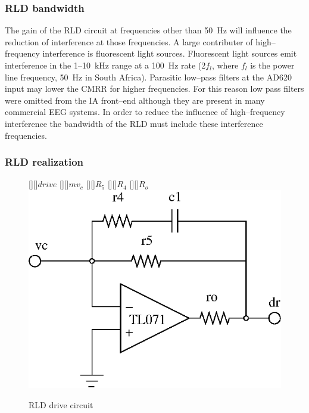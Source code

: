 \subsubsection{RLD bandwidth}
The gain of the RLD circuit at frequencies other than 50~Hz will
influence the reduction of interference at those frequencies. A large
contributer of high--frequency interference is fluorescent light
sources. Fluorescent light sources emit interference in the 1--10~kHz
range at a 100~Hz rate (2$f_l$, where $f_l$ is the power line
frequency, 50~Hz in South Africa). Parasitic low--pass filters at the
AD620 input may lower the CMRR for higher frequencies. For this reason
low pass filters were omitted from the IA front--end although they are
present in many commercial EEG systems. In order to reduce the
influence of high--frequency interference the bandwidth of the RLD must
include these interference frequencies.


\subsubsection{RLD realization}

\begin{figure}[htbp]
\begin{center}
	[][]{$drive$}
	[][]{$mv_c$}  
	[][]{$R_5$} 
	[][]{$R_4$} 
	[][]{$R_o$} 
	\psfrag{+}{+}
	\psfrag{-}{--}
	\includegraphics{rl-drive.eps}
	\caption{RLD drive circuit}
	\label{fig:rl-drive} 
\end{center}
\end{figure}



